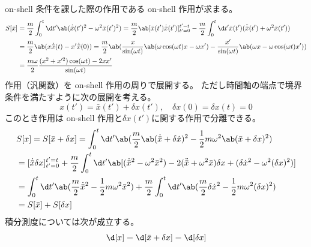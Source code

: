 on-shell 条件を課した際の作用である on-shell 作用が求まる。
\begin{equation}
  \begin{split}
    S[\bar{x}]
    &=\frac{m}{2}\int_0^t\d t'\ab(\dot{\bar{x}}(t')^2-\omega^2\bar{x}(t')^2)
    =\frac{m}{2}\ab[\bar{x}(t')\dot{\bar{x}}(t')]_{t'=0}^{t'=t}
    -\frac{m}{2}\int_0^t\d t'\bar{x}(t')(\ddot{\bar{x}}(t')+\omega^2\bar{x}(t')) \\
    &=\frac{m}{2}\ab(x\dot{\bar{x}}(t)-x'\dot{\bar{x}}(0))
    =\frac{m}{2}\ab(
    \frac{x}{\sin(\omega t)}\ab(
      \omega\cos(\omega t)x-\omega x')
    -\frac{x'}{\sin(\omega t)}\ab(
      \omega x-\omega\cos(\omega t) x')
    ) \\
    &=\frac{m\omega}{2}\frac{
      (x^2+x'^2)\cos(\omega t)-2xx'
    }{\sin(\omega t)}
  \end{split}
\end{equation}
作用（汎関数）を on-shell 作用の周りで展開する。
ただし時間軸の端点で境界条件を満たすように次の展開を考える。
\begin{equation}
  x(t')=\bar{x}(t')+\delta x(t'),\quad
  \delta x(0)=\delta x(t)=0
\end{equation}
このとき作用は on-shell 作用と$\delta x(t')$に関する作用で分離できる。
\begin{equation}
  \begin{split}
    &S[x]=S[\bar{x}+\delta x]
    =\int_0^t\d t'\ab(
    \frac{m}{2}\ab(\dot{\bar{x}}+\delta\dot{x})^2
    -\frac{1}{2}m\omega^2\ab(\bar{x}+\delta x)^2
    ) \\
    &=
    [\dot{\bar{x}}\delta x]_{t'=0}^{t'=t}+
    \frac{m}{2}\int_0^t\d t'\ab[
      (\dot{\bar{x}}^2-\omega^2\bar{x}^2)
      -2(\ddot{\bar{x}}+\omega^2\bar{x})\delta x
      +(\delta\dot{x}^2-\omega^2(\delta x)^2)
    ] \\
    &=\int_0^t\d t'
    \ab(\frac{m}{2}\dot{\bar{x}}^2-\frac{1}{2}m\omega^2\bar{x}^2)
    +\frac{m}{2}\int_0^t\d t'
    \ab(\frac{m}{2}\delta\dot{x}^2-\frac{1}{2}m\omega^2(\delta x)^2) \\
    &=S[\bar{x}]+S[\delta x]
  \end{split}
\end{equation}
積分測度については次が成立する。
\begin{equation}
  \d[x]=\d[\bar{x}+\delta x]=\d[\delta x]
\end{equation}

